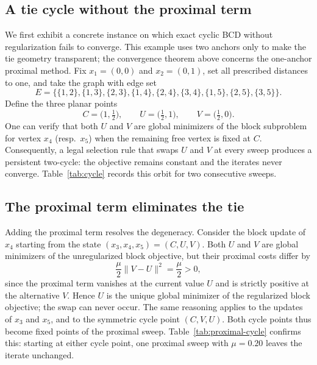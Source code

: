 \documentclass[11pt]{article}
\begin{document}
\subsection{A tie cycle without the proximal term}
\label{subsec:cycle}

We first exhibit a concrete instance on which exact cyclic BCD without regularization fails to converge.  This example uses two anchors only to make the tie geometry transparent; the convergence theorem above concerns the one-anchor proximal method.  Fix \(x_1=(0,0)\) and \(x_2=(0,1)\), set all prescribed distances to one, and take the graph with edge set
\[
    E=\bigl\{\{1,2\},\{1,3\},\{2,3\},\{1,4\},\{2,4\},\{3,4\},\{1,5\},\{2,5\},\{3,5\}\bigr\}.
\]
Define the three planar points
\[
    C=\bigl(1,\tfrac{1}{2}\bigr),\qquad
    U=\bigl(\tfrac{1}{2},1\bigr),\qquad
    V=\bigl(\tfrac{1}{2},0\bigr).
\]
One can verify that both \(U\) and \(V\) are global minimizers of the block subproblem for vertex \(x_4\) (resp.\ \(x_5\)) when the remaining free vertex is fixed at \(C\).  Consequently, a legal selection rule that swaps \(U\) and \(V\) at every sweep produces a persistent two-cycle: the objective remains constant and the iterates never converge.  Table~\ref{tab:cycle} records this orbit for two consecutive sweeps.

\begin{table}[ht]
\centering

\caption{Two-cycle of the unregularized exact cyclic method arising from nonunique block minimizers.  The objective $F$ is constant and the sweep step $\|z^{r+1}-z^r\|$ does not tend to zero.}
\label{tab:cycle}
\end{table}

\subsection{The proximal term eliminates the tie}
\label{subsec:proximal-tie}

Adding the proximal term resolves the degeneracy.  Consider the block update of \(x_4\) starting from the state \((x_3,x_4,x_5)=(C,U,V)\).  Both \(U\) and \(V\) are global minimizers of the unregularized block objective, but their proximal costs differ by
\[
    \frac{\mu}{2}\|V-U\|^2
    =
    \frac{\mu}{2}
    >
    0,
\]
since the proximal term vanishes at the current value \(U\) and is strictly positive at the alternative \(V\).  Hence \(U\) is the unique global minimizer of the regularized block objective; the swap can never occur.  The same reasoning applies to the updates of \(x_3\) and \(x_5\), and to the symmetric cycle point \((C,V,U)\).  Both cycle points thus become fixed points of the proximal sweep.  Table~\ref{tab:proximal-cycle} confirms this: starting at either cycle point, one proximal sweep with \(\mu=0.20\) leaves the iterate unchanged.
\end{document}
